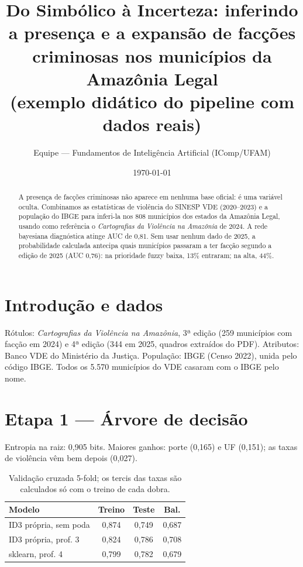 \documentclass[10pt,a4paper,twocolumn]{article}
\title{Do Simbólico à Incerteza: inferindo a presença e a expansão de facções criminosas nos municípios da Amazônia Legal\\
\large (exemplo didático do pipeline com dados reais)}
\author{Equipe — Fundamentos de Inteligência Artificial (IComp/UFAM)}
\date{\today}
\begin{document}
\maketitle

\begin{abstract}
A presença de facções criminosas não aparece em nenhuma base oficial: é uma variável oculta.
Combinamos as estatísticas de violência do SINESP VDE (2020--2023) e a população do IBGE para
inferi-la nos 808 municípios dos estados da Amazônia Legal, usando como referência o
\emph{Cartografias da Violência na Amazônia} de 2024. A rede bayesiana diagnóstica atinge
AUC de 0,81. Sem usar nenhum dado de 2025, a probabilidade calculada antecipa quais municípios
passaram a ter facção segundo a edição de 2025 (AUC 0,76): na prioridade fuzzy baixa, 13\%
entraram; na alta, 44\%.
\end{abstract}

\section{Introdução e dados}
Rótulos: \emph{Cartografias da Violência na Amazônia}, 3ª edição (259 municípios com facção em
2024) e 4ª edição (344 em 2025, quadros extraídos do PDF). Atributos: Banco VDE do Ministério da
Justiça. População: IBGE (Censo 2022), unida pelo código IBGE. Todos os 5.570 municípios do VDE
casaram com o IBGE pelo nome.

\section{Etapa 1 — Árvore de decisão}
Entropia na raiz: 0,905 bits. Maiores ganhos: porte (0,165) e UF (0,151); as taxas de violência
vêm bem depois (0,027).
\begin{table}[h]\centering\small
\begin{tabular}{lccc}\toprule
Modelo & Treino & Teste & Bal.\\\midrule
ID3 própria, sem poda & 0,874 & 0,749 & 0,687\\
ID3 própria, prof. 3 & 0,824 & 0,786 & 0,708\\
sklearn, prof. 4 & 0,799 & 0,782 & 0,679\\\bottomrule
\end{tabular}\caption{Validação cruzada 5-fold; os tercis das taxas são calculados só com o treino de cada dobra.}\end{table}
\end{document}
